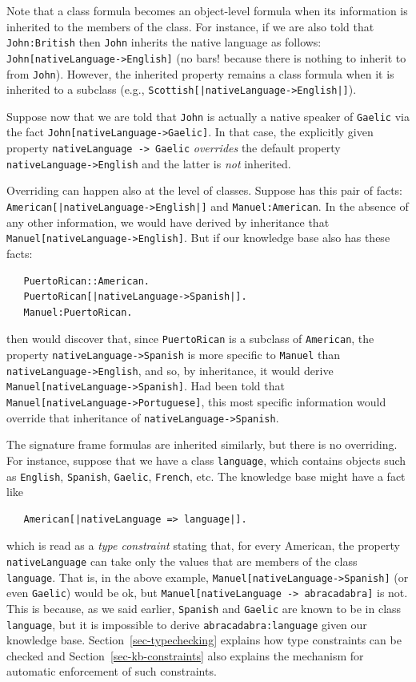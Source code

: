 \documentclass[11pt]{article}
\newcommand{\ERGO}{\mbox{\smaller{\ensuremath{\cal{E}}\smaller{{\sc{RGO}}}}}\xspace}
\newcommand{\FLSYSTEM}{\ERGO}
\begin{document}
  Note that a class formula becomes an object-level formula when its
  information is inherited to the members of the class. For instance, if we
  are also told that \texttt{John:British} then \texttt{John} inherits the
  native language as follows:  
  \texttt{John[nativeLanguage->English]} (no bars! because there is
  nothing to inherit to from \texttt{John}).
  However, the inherited property remains a class formula
  when it is inherited to a subclass (e.g.,
  \texttt{Scottish[|nativeLanguage->English|]}).

Suppose now that we are told that \texttt{John} is actually a native
speaker of \texttt{Gaelic} via the fact   \texttt{John[nativeLanguage->Gaelic]}.
In that case, the explicitly given property \texttt{nativeLanguage -> Gaelic}
\emph{overrides} the default property \texttt{nativeLanguage->English}  and
the latter is \emph{not} inherited.

Overriding can happen also at the level of classes. Suppose \FLSYSTEM has
this pair of facts: \texttt{American[|nativeLanguage->English|]} and
\texttt{Manuel:American}. In the absence of any other information, we
would have derived by inheritance that
\texttt{Manuel[nativeLanguage->English]}.
But if our knowledge base also has these facts:
\begin{verbatim}
   PuertoRican::American.
   PuertoRican[|nativeLanguage->Spanish|].
   Manuel:PuertoRican.
\end{verbatim}
then \FLSYSTEM would discover that, since \texttt{PuertoRican} is a
subclass of \texttt{American}, the property
\texttt{nativeLanguage->Spanish}  is more specific to \texttt{Manuel} than
\texttt{nativeLanguage->English}, and so, by inheritance,  it would derive 
\texttt{Manuel[nativeLanguage->Spanish]}.
Had \FLSYSTEM been told that \texttt{Manuel[nativeLanguage->Portuguese]},
this
most specific information would override that inheritance of
\texttt{nativeLanguage->Spanish}.

The signature frame formulas are inherited similarly, but there is no
overriding. For instance, suppose that we have a class \texttt{language},
which contains objects such as \texttt{English}, \texttt{Spanish},
\texttt{Gaelic}, 
\texttt{French}, etc. The knowledge base might have a fact like
\begin{verbatim}
   American[|nativeLanguage => language|].
\end{verbatim}
which is read as a \emph{type constraint} stating that, for every American,
the property \texttt{nativeLanguage} can take only the values that are
members of the class \texttt{language}. That is, in the above example,
\texttt{Manuel[nativeLanguage->Spanish]} (or even \texttt{Gaelic})
would be ok, but \texttt{Manuel[nativeLanguage -> abracadabra]} is not. This
is because, as we said earlier, \texttt{Spanish} and \texttt{Gaelic} are 
known to be in class \texttt{language}, but it is impossible to derive
\texttt{abracadabra:language} given our knowledge
base.
Section~\ref{sec-typechecking} explains how type constraints can be
checked and Section~\ref{sec-kb-constraints} also explains the mechanism for
automatic enforcement of such constraints.
\end{document}
